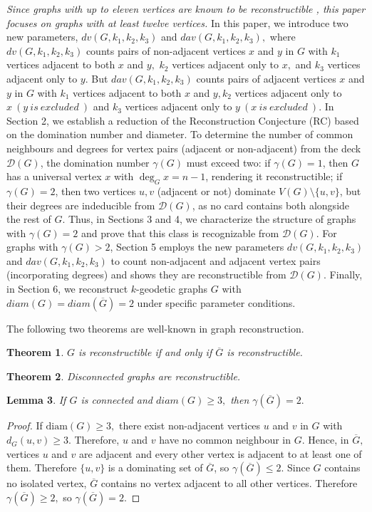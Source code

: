 \documentclass[11pt,oneside]{article}
\newtheorem{thm}{Theorem}
\newtheorem{lem}[thm]{Lemma}
\theoremstyle{definition}
\begin{document}
{\it Since graphs with up to eleven  vertices are  known to be reconstructible \cite{bd}, this paper focuses on  graphs with at least twelve vertices.} In this paper, we introduce two new parameters, $dv(G,k_1,k_2,k_3)$ and $dav(G,k_1,k_2,k_3),$ where  $dv(G,k_1,k_2,k_3)$ counts pairs of non-adjacent vertices $x$ and $y$ in $G$ with $k_1$ vertices adjacent to both $x$ and $y,$ $k_2$ vertices adjacent only to $x,$ and $k_3$ vertices adjacent only to $y.$  But $dav(G,k_1,k_2,k_3)$ counts pairs of adjacent vertices $x$ and $y$ in $G$ with $k_1$ vertices adjacent to both $x$ and $y,k_2$ vertices adjacent only to $x~(y ~ is ~ excluded ~)$ and $k_3$ vertices adjacent only to $y ~(x ~ is ~ excluded ~).$ In Section 2, we establish a reduction of the Reconstruction Conjecture (RC) based on the domination number and diameter. To determine the number of common neighbours and degrees for vertex pairs (adjacent or non-adjacent) from the deck $\mathscr{D}(G)$, the domination number $\gamma(G)$ must exceed two: if $\gamma(G)=1$, then $G$ has a universal vertex $x$ with $\deg_G x = n-1$, rendering it reconstructible; if $\gamma(G)=2$, then two vertices $u,v$ (adjacent or not) dominate $V(G)\setminus\{u,v\}$, but their degrees are indeducible from $\mathscr{D}(G)$, as no card contains both alongside the rest of $G$. Thus, in Sections 3 and 4, we characterize the structure of graphs with $\gamma(G)=2$ and prove that this class is recognizable from $\mathscr{D}(G)$. For graphs with $\gamma(G)>2$, Section 5 employs the new parameters $dv(G,k_1,k_2,k_3)$ and $dav(G,k_1,k_2,k_3)$ to count non-adjacent and adjacent vertex pairs (incorporating degrees) and shows they are reconstructible from $\mathscr{D}(G)$. Finally, in Section 6, we reconstruct $k$-geodetic graphs $G$ with $diam(G)=diam(\overline{G})=2$ under specific parameter conditions.
  

The following two theorems are well-known in graph reconstruction.
\begin{thm}\label{t1}
$G$ is reconstructible if and only if  $\overline{G}$ is reconstructible.
\end{thm}

\begin{thm}\label{t2}
Disconnected graphs are reconstructible.
\end{thm}

\begin{lem}\label{L3}
If $G$ is connected and  $diam(G) \geq 3,$ then $\gamma(\overline{G})=2.$
\end{lem}
\begin{proof}
If $\text{diam}(G) \geq 3,$ there exist non-adjacent vertices $u$ and $v$ in $G$ with $d_{G}(u,v) \geq 3.$ Therefore, $u$ and $v$ have no common neighbour in $G.$ Hence, in $\overline{G},$ vertices $u$ and $v$ are adjacent and every other vertex is adjacent to at least one of them. Therefore $\{u,v\}$ is a dominating set of $\overline{G}$, so $\gamma(\overline{G}) \leq 2.$ Since $G$ contains no isolated vertex,  $\overline{G}$ contains no vertex adjacent to all other vertices. Therefore $\gamma(\overline{G})\geq 2,$ so $\gamma(\overline{G})=2.$
\end{proof}
\end{document}
